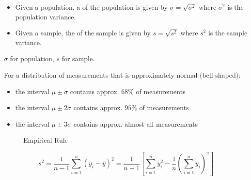 \begin{nota}
\end{nota}

\begin{defn}
    \begin{itemize}
        \item Given a population, a  of the population is given by $\sigma = \sqrt{\sigma^{2}}$ where $\sigma^{2}$ is the population variance.
        \item Given a sample, the  of the sample is given by $s = \sqrt{s^{2}}$ where $s^{2}$ is the sample variance.
    \end{itemize}
\end{defn}

\begin{nota}
    $\sigma$ for population, $s$ for sample.
\end{nota}

\begin{note}
    For a distribution of measurements that is approximately normal (bell-shaped):
    \begin{itemize}
        \item the interval $\mu \pm \sigma$ contains approx. $68\%$ of measurements
        \item the interval $\mu \pm 2\sigma$ contains approx. $95\%$ of measurements
        \item the interval $\mu \pm 3\sigma$ contains approx. almost all measurements
    \end{itemize}

    \begin{figure}[h]
        \vspace{-40pt}
        \centering
        
        \vspace{-40pt}
        \caption{Empirical Rule}
        \label{fig:emprule}
    \end{figure}
\end{note}

\begin{lemm}
    $$s^{2} = \frac{1}{n-1} \sum_{i=1}^{n} (y_{i} - \bar{y})^{2} = \frac{1}{n-1} \left[\sum_{i=1}^{n} y_{i}^{2} - \frac{1}{n} \left(\sum_{i=1}^{n} y_{i}\right)^{2}\right]$$
\end{lemm}

